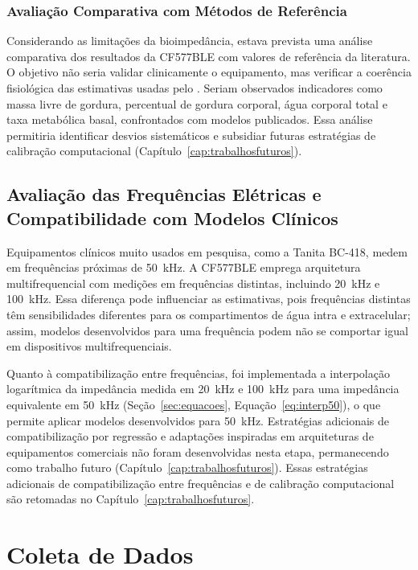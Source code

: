 \subsubsection{Avaliação Comparativa com Métodos de Referência}

Considerando as limitações da bioimpedância, estava prevista uma análise comparativa dos
resultados da CF577BLE com valores de referência da literatura. O objetivo não seria
validar clinicamente o equipamento, mas verificar a coerência fisiológica das estimativas
usadas pelo \sintonia. Seriam observados indicadores como massa livre de gordura,
percentual de gordura corporal, água corporal total e taxa metabólica basal, confrontados
com modelos publicados. Essa análise permitiria identificar desvios sistemáticos e
subsidiar futuras estratégias de calibração computacional (Capítulo~\ref{cap:trabalhosfuturos}).

\subsection{Avaliação das Frequências Elétricas e Compatibilidade com Modelos Clínicos}

Equipamentos clínicos muito usados em pesquisa, como a Tanita BC-418, medem em frequências
próximas de 50~kHz. A CF577BLE emprega arquitetura multifrequencial com medições em
frequências distintas, incluindo 20~kHz e 100~kHz. Essa diferença pode influenciar as
estimativas, pois frequências distintas têm sensibilidades diferentes para os
compartimentos de água intra e extracelular; assim, modelos desenvolvidos para uma
frequência podem não se comportar igual em dispositivos multifrequenciais.

Quanto à compatibilização entre frequências, foi implementada a interpolação logarítmica
da impedância medida em 20~kHz e 100~kHz para uma impedância equivalente em 50~kHz
(Seção~\ref{sec:equacoes}, Equação~\ref{eq:interp50}), o que permite aplicar modelos
desenvolvidos para 50~kHz. Estratégias adicionais de compatibilização por regressão e
adaptações inspiradas em arquiteturas de equipamentos comerciais não foram desenvolvidas
nesta etapa, permanecendo como trabalho futuro (Capítulo~\ref{cap:trabalhosfuturos}). Essas
estratégias adicionais de compatibilização entre frequências e de calibração computacional
são retomadas no Capítulo~\ref{cap:trabalhosfuturos}.

\section{Coleta de Dados}

